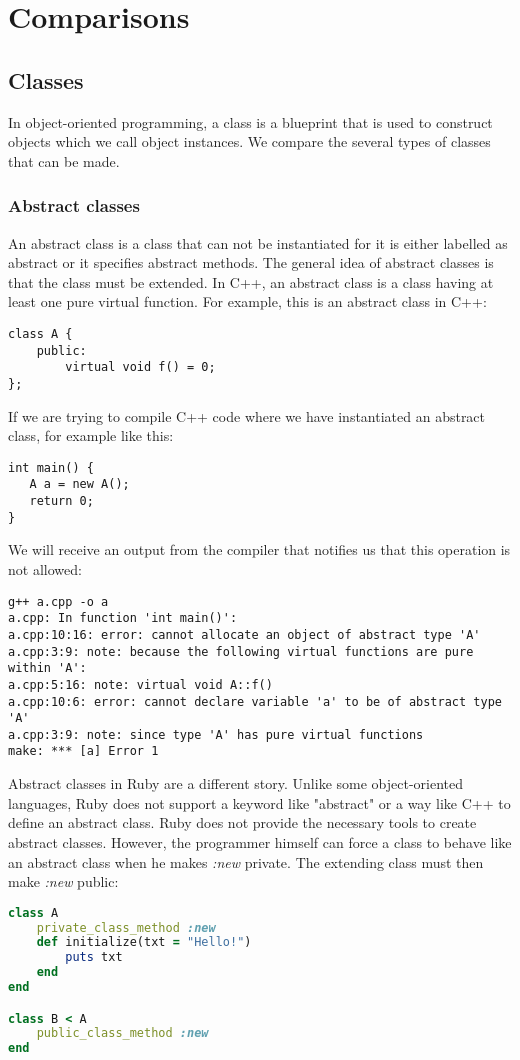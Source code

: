 \documentclass[10pt,a4paper,twocolumn]{article}
\begin{document}
\section{Comparisons}

\subsection{Classes}
In object-oriented programming, a class is a blueprint that is used to construct objects which we call object instances. We compare the several types of classes that can be made.

\subsubsection{Abstract classes}
An abstract class is a class that can not be instantiated for it is either labelled as abstract or it specifies abstract methods. The general idea of abstract classes is that the class must be extended. In C++, an abstract class is a class having at least one pure virtual function. For example, this is an abstract class in C++:
\begin{lstlisting}
class A {
	public:
		virtual void f() = 0;
};
\end{lstlisting}
If we are trying to compile C++ code where we have instantiated an abstract class, for example like this:
\begin{lstlisting}
int main() {
   A a = new A();
   return 0;
}
\end{lstlisting}
We will receive an output from the compiler that notifies us that this operation is not allowed:
\begin{lstlisting}
g++ a.cpp -o a
a.cpp: In function 'int main()':
a.cpp:10:16: error: cannot allocate an object of abstract type 'A'
a.cpp:3:9: note: because the following virtual functions are pure within 'A':
a.cpp:5:16: note: virtual void A::f()
a.cpp:10:6: error: cannot declare variable 'a' to be of abstract type 'A'
a.cpp:3:9: note: since type 'A' has pure virtual functions
make: *** [a] Error 1
\end{lstlisting}
Abstract classes in Ruby are a different story. Unlike some object-oriented languages, Ruby does not support a keyword like "abstract" or a way like C++ to define an abstract class. Ruby does not provide the necessary tools to create abstract classes. However, the programmer himself can force a class to behave like an abstract class when he makes \textit{:new} private. The extending class must then make \textit{:new} public:
\begin{lstlisting}[language=Ruby]
class A
	private_class_method :new
	def initialize(txt = "Hello!")
		puts txt
	end
end

class B < A
	public_class_method :new
end
\end{lstlisting}
\end{document}
